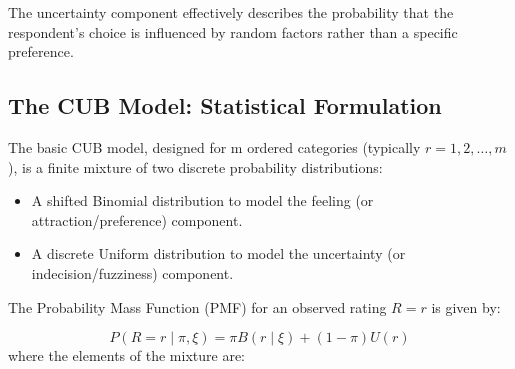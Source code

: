 \documentclass[
  letterpaper,
  DIV=11,
  numbers=noendperiod]{scrartcl}
\providecommand{\tightlist}{%
  \setlength{\itemsep}{0pt}\setlength{\parskip}{0pt}}\usepackage{longtable,booktabs,array}
\begin{document}
The uncertainty component effectively describes the probability that the
respondent's choice is influenced by random factors rather than a
specific preference.

\hypertarget{the-cub-model-statistical-formulation}{%
\subsection{The CUB Model: Statistical
Formulation}\label{the-cub-model-statistical-formulation}}

The basic CUB model, designed for m ordered categories (typically
\(r=1,2,\dots,m\)), is a finite mixture of two discrete probability
distributions:

\begin{itemize}
\tightlist
\item
  A shifted Binomial distribution to model the feeling (or
  attraction/preference) component.
\item
  A discrete Uniform distribution to model the uncertainty (or
  indecision/fuzziness) component.
\end{itemize}

The Probability Mass Function (PMF) for an observed rating \(R=r\) is
given by:

\[
P(R = r \mid \pi,\xi) = \pi B(r \mid\xi) + (1-\pi)U(r)
\] where the elements of the mixture are:
\end{document}

